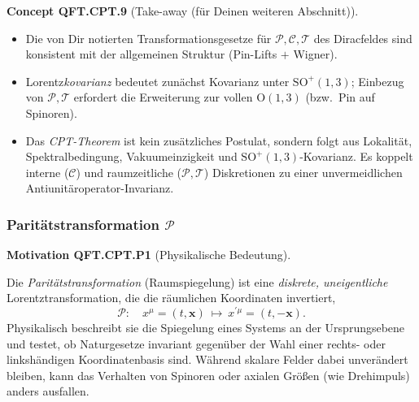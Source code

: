 \documentclass[10pt, letterpaper]{article}
\newcommand{\SO}{\mathrm{SO}}
\newcommand{\Pin}{\mathrm{Pin}}
\newcommand{\Ogroup}{\mathrm{O}}
\newcommand{\CustomHeading}[3]{%
  \par\medskip\noindent%
  \textbf{#1 #2} \textnormal{(#3)}.\enskip%
}
\newenvironment{CONC}[2]{\begin{unitbox}\CustomHeading{Concept}{#1}{#2}}{\end{unitbox}}
\newenvironment{MOT}[2]{\begin{unitbox}\CustomHeading{Motivation}{#1}{#2}}{\end{unitbox}}
\begin{document}
\begin{CONC}{QFT.CPT.9}{Take-away (für Deinen weiteren Abschnitt)}
\begin{itemize}
  \item Die von Dir notierten Transformationsgesetze für $\mathcal P,\mathcal C,\mathcal T$ des Diracfeldes sind konsistent mit der allgemeinen Struktur (Pin-Lifts $+$ Wigner).
  \item Lorentz\emph{kovarianz} bedeutet zunächst Kovarianz unter $\SO^+(1,3)$; Einbezug von $\mathcal P,\mathcal T$ erfordert die Erweiterung zur vollen $\Ogroup(1,3)$ (bzw.\ $\Pin$ auf Spinoren). 
  \item Das \emph{CPT-Theorem} ist kein zusätzliches Postulat, sondern folgt aus Lokalität, Spektralbedingung, Vakuum­einzigkeit und $\SO^+(1,3)$-Kovarianz. Es koppelt interne ($\mathcal C$) und raumzeitliche ($\mathcal P,\mathcal T$) Diskretionen zu einer unvermeidlichen Antiunitäroperator-Invarianz.
\end{itemize}
\end{CONC}


\subsubsection{Paritätstransformation $\mathcal P$}

\begin{MOT}{QFT.CPT.P1}{Physikalische Bedeutung}
Die \emph{Paritätstransformation} (Raumspiegelung) ist eine \emph{diskrete, uneigentliche} Lorentztransformation, die die räumlichen Koordinaten invertiert,
\[
\mathcal P:\quad x^\mu=(t,\mathbf x)\ \longmapsto\ x^{\prime\mu}=(t,-\mathbf x).
\]
Physikalisch beschreibt sie die Spiegelung eines Systems an der Ursprungsebene und testet, ob Naturgesetze invariant gegenüber der Wahl einer rechts- oder linkshändigen Koordinatenbasis sind. Während skalare Felder dabei unverändert bleiben, kann das Verhalten von Spinoren oder axialen Größen (wie Drehimpuls) anders ausfallen.
\end{MOT}
\end{document}
